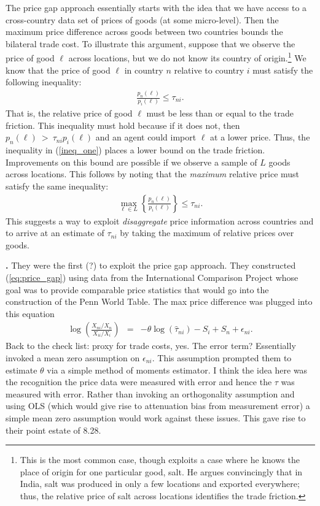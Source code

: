 \documentclass[pdftex,12pt]{article}
\begin{document}
The price gap approach essentially starts with the idea that we have access to a cross-country data set of prices of goods (at some micro-level). Then the maximum price difference across goods between two countries bounds the bilateral trade cost. To illustrate this argument, suppose that we observe the price of good $\ell$ across locations, but we do not know its country of origin.\footnote{This is the most common case, though \citet{donaldson09} exploits a case where he knows the place of origin for one particular good, salt. He argues convincingly that in India, salt was produced in only a few locations and exported everywhere; thus, the relative price of salt across locations identifies the trade friction.} We know that the price of good $\ell$ in country $n$ relative to country $i$ must satisfy the following inequality:
\begin{eqnarray}
\frac{p_n(\ell)}{p_i(\ell)} \leq \tau_{ni}.
\label{ineq_one}
\end{eqnarray}
That is, the relative price of good $\ell$ must be less than or equal to the trade friction. This inequality must hold because if it does not, then $p_n(\ell) \ > \ \tau_{ni}p_i(\ell)$ and an agent could import $\ell$ at a lower price. Thus, the inequality in (\ref{ineq_one}) places a lower bound on the trade friction. Improvements on this bound are possible if we observe a sample of $L$ goods across locations. This follows by noting that the \emph{maximum} relative price must satisfy the same inequality:
\begin{eqnarray}
\max_{\ell \in L}\left\{\frac{p_n(\ell)}{p_i(\ell)}\right\} \leq \tau_{ni}.
\label{eq:price_gap}
\end{eqnarray}
This suggests a way to exploit \emph{disaggregate} price information across countries and to arrive at an estimate of $\tau_{ni}$ by taking the maximum of relative prices over goods.

\textbf{\citet{eaton2002technology}.} They were the first (?) to exploit the price gap approach. They constructed (\ref{eq:price_gap}) using data from the International Comparison Project whose goal was to provide comparable price statistics that would go into the construction of the Penn World Table. The max price difference was plugged into this equation
\begin{eqnarray}
\displaystyle \log\left(\frac{X_{ni}/X_n}{X_{ii}/X_i}\right)&=&-\theta \log\left(\hat \tau_{ni}\right) -  S_i +  S_n + \epsilon_{ni}.
\label{eq:log_elasticity_trade_c}
\end{eqnarray}
Back to the check list: proxy for trade costs, yes. The error term? Essentially \citet{eaton2002technology} invoked a mean zero assumption on $\epsilon_{ni}$. This assumption prompted them to estimate $\theta$ via a simple method of moments estimator. I think the idea here was the recognition the price data were measured with error and hence the $\tau$ was measured with error. Rather than invoking an orthogonality assumption and using OLS (which would give rise to attenuation bias from measurement error) a simple mean zero assumption would work against these issues. This gave rise to their point estate of 8.28.
\end{document}
